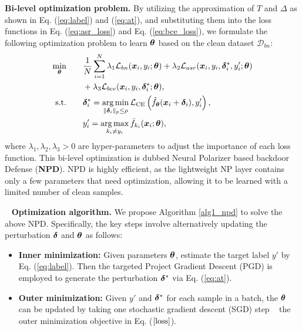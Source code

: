 \noindent \textbf{Bi-level optimization problem.}
By utilizing the approximation of \(T\) and \(\Delta\) as shown in Eq. (\ref{eq:label}) and (\ref{eq:at}), and substituting them into the loss functions in Eq. (\ref{eq:asr_loss}) and Eq. (\ref{eq:bce_loss}), we formulate the following optimization problem to learn \(\bm{\theta}\) based on the clean dataset \(\mathcal{D}_{bn}\):
\begin{equation}\label{loss}
\begin{aligned}
    \min_{\bm{\theta}} \quad \quad & \frac{1}{N}\sum_{i=1}^N \lambda_1 \mathcal{L}_{bn}({\bm{x}_i,y_i};\bm{\theta}) +  \lambda_2 \mathcal{L}_{asr}({\bm{x}_i,y_i,\bm{\delta}^*_i, y'_i;\bm{\theta}}) \\
    & + \lambda_3 \mathcal{L}_{bce}({\bm{x}_i,y_i,\bm{\delta}^*_i;\bm{\theta}}),\\
    \mathrm{s.t.} \quad \quad & \bm{\delta}^*_i = \operatorname*{arg\,min}_{\|\bm{\delta}_i\|_p\leq \rho} \mathcal{L}_{\text{CE}}\left(\hat{f}_{\bm{\theta}}(\bm{x}_i+\bm{\delta}_i), y'_i\right), \\
    & y'_i = \operatorname*{arg\,max}_{k_i \neq y_i} \hat{f}_{k_i}(\bm{x}_i;\bm{\theta}),
\end{aligned}
\end{equation}
where $\lambda_1,\lambda_2,\lambda_3 > 0 $ are hyper-parameters to adjust the importance of each loss function. 
This bi-level optimization is dubbed Neural Polarizer based backdoor Defense (\textbf{NPD}).
NPD is highly efficient, as the lightweight NP layer contains only a few parameters that need optimization, allowing it to be learned with a limited number of clean samples.

\ 
\newline
\noindent
\quad 
\textbf{Optimization algorithm.} We propose Algorithm \ref{alg1_npd} to solve the above NPD. Specifically, the key steps involve alternatively updating the perturbation $\bm{\delta}$ and $\bm{\theta}$ as follows:
\begin{itemize}[leftmargin=*]
    \item \textbf{Inner minimization:} Given parameters $\bm{\theta}$, estimate the target label $y'$ by Eq. (\ref{eq:label}). Then the targeted Project Gradient Descent (PGD) \cite{madry2017towards} is employed to generate the perturbation $\bm{\delta}^*$ via Eq. (\ref{eq:at}).
    \item  \textbf{Outer minimization:} Given $y'$ and $\bm{\delta}^*$ for each sample in a batch, the $\bm{\theta}$ can be updated by taking one stochastic gradient descent \cite{bottou2007tradeoffs} (SGD) step \wrt~ the outer minimization objective in Eq. ($\ref{loss}$).
\end{itemize}

